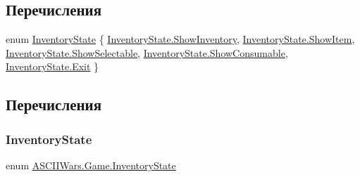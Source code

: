 \subsection*{Перечисления}
\begin{DoxyCompactItemize}
\item 
enum \hyperlink{namespace_a_s_c_i_i_wars_1_1_game_a38949febfe4ff7d83568273830f42e5a}{Inventory\+State} \{ \newline
\hyperlink{namespace_a_s_c_i_i_wars_1_1_game_a38949febfe4ff7d83568273830f42e5aa5e035f78e07eda1a93846b8ea0e9589b}{Inventory\+State.\+Show\+Inventory}, 
\hyperlink{namespace_a_s_c_i_i_wars_1_1_game_a38949febfe4ff7d83568273830f42e5aafb91889eb4e48cf1ecb2b6f39405d724}{Inventory\+State.\+Show\+Item}, 
\hyperlink{namespace_a_s_c_i_i_wars_1_1_game_a38949febfe4ff7d83568273830f42e5aa011a738f4f78ce6394f16784769a82c4}{Inventory\+State.\+Show\+Selectable}, 
\hyperlink{namespace_a_s_c_i_i_wars_1_1_game_a38949febfe4ff7d83568273830f42e5aad522e5cef00735497c26885b05b6ad60}{Inventory\+State.\+Show\+Consumable}, 
\newline
\hyperlink{namespace_a_s_c_i_i_wars_1_1_game_a38949febfe4ff7d83568273830f42e5aafef46e5063ce3dc78b8ae64fa474241d}{Inventory\+State.\+Exit}
 \}
\end{DoxyCompactItemize}


\subsection{Перечисления}
\hypertarget{namespace_a_s_c_i_i_wars_1_1_game_a38949febfe4ff7d83568273830f42e5a}{}\label{namespace_a_s_c_i_i_wars_1_1_game_a38949febfe4ff7d83568273830f42e5a} 
\subsubsection{\texorpdfstring{Inventory\+State}{InventoryState}}
{\footnotesize\ttfamily enum \hyperlink{namespace_a_s_c_i_i_wars_1_1_game_a38949febfe4ff7d83568273830f42e5a}{A\+S\+C\+I\+I\+Wars.\+Game.\+Inventory\+State}\hspace{0.3cm}{\ttfamily [strong]}}

